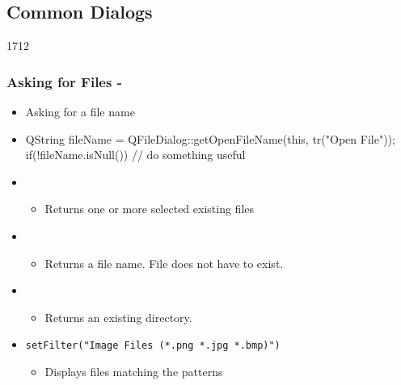 \subsection{Common Dialogs}

\begin{slide}[fragile]{1712}
  \frametitle{Asking for Files - }
  \begin{itemize}
  \item Asking for a file name
  \item[]
    \begin{cpp}
QString fileName = 
  QFileDialog::getOpenFileName(this, tr("Open File"));      
if(!fileName.isNull()) {
  // do something useful
}
    \end{cpp}
  \item {}
    \begin{itemize}
    \item Returns one or more selected existing files
    \end{itemize}
  \item {}
    \begin{itemize}
    \item Returns a file name. File does not have to exist.
    \end{itemize}
  \item {}
    \begin{itemize}
    \item Returns an existing directory.
    \end{itemize}
  \item \texttt{setFilter("Image Files (*.png *.jpg *.bmp)")}
    \begin{itemize}
    \item Displays files matching the patterns
    \end{itemize}
  \end{itemize}
\end{slide}

